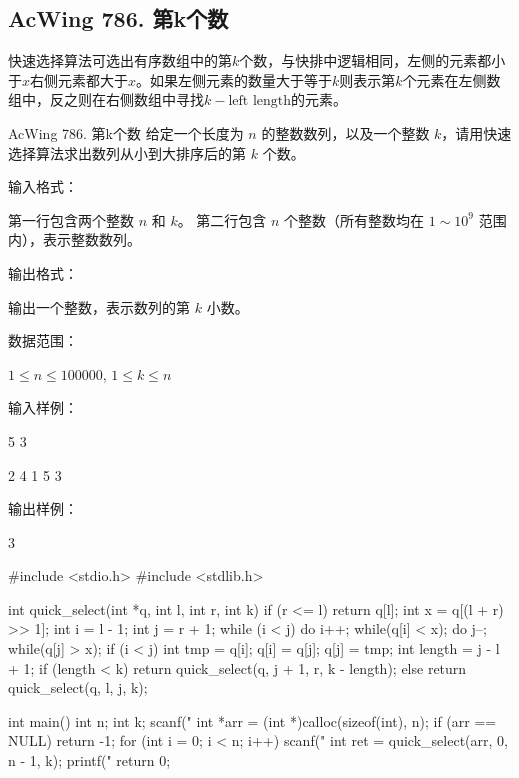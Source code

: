 \subsection{AcWing 786. 第k个数}
快速选择算法可选出有序数组中的第$k$个数，与快排中逻辑相同，左侧的元素都小于$x$右侧元素都大于$x$。如果左侧元素的数量大于等于$k$则表示第$k$个元素在左侧数组中，反之则在右侧数组中寻找$k-\text{left length}$的元素。

\begin{titledbox}{AcWing 786. 第k个数}
给定一个长度为 $n$ 的整数数列，以及一个整数 $k$，请用快速选择算法求出数列从小到大排序后的第 $k$ 个数。

输入格式：

第一行包含两个整数 $n$ 和 $k$。
第二行包含 $n$ 个整数（所有整数均在 $1 \sim 10^9$ 范围内），表示整数数列。

输出格式：

输出一个整数，表示数列的第 $k$ 小数。

数据范围：

$1 \le n \le 100000$,
$1 \le k \le n$

输入样例：

5 3

2 4 1 5 3


输出样例：

3
\end{titledbox}


\begin{mycpptwocol}
    #include <stdio.h>
    #include <stdlib.h>

    int quick_select(int *q, int l, int r, int k)
    {
        if (r <= l) {
            return q[l];
        }
        int x = q[(l + r) >> 1];
        int i = l - 1;
        int j = r + 1;
        while (i < j) {
            do i++; while(q[i] < x);
            do j--; while(q[j] > x);
            if (i < j) {
                int tmp = q[i];
                q[i] = q[j];
                q[j] = tmp;
            }
        }
        int length = j - l + 1;
        if (length < k) {
            return quick_select(q, j + 1, r, k - length);
        } else {
            return quick_select(q, l, j, k);
        }
    }

    int main()
    {
        int n;
        int k;
        scanf("%
        int *arr = (int *)calloc(sizeof(int), n);
        if (arr == NULL) {
            return -1;
        }
        for (int i = 0; i < n; i++) {
            scanf("%
        }
        int ret = quick_select(arr, 0, n - 1, k);
        printf("%
        return 0;
    }
\end{mycpptwocol}

